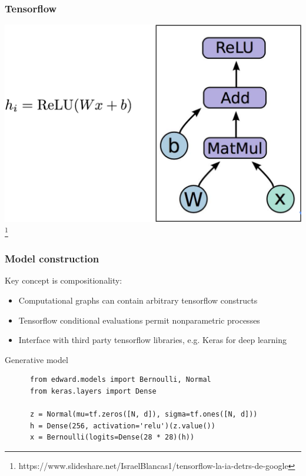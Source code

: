 \documentclass[10pt]{beamer}
\begin{document}
\begin{frame}[fragile]
  \frametitle{Tensorflow}
  \includegraphics[width=\textwidth]{img/tensorflow}
  \footnote{https://www.slideshare.net/IsraelBlancas1/tensorflow-la-ia-detrs-de-google}
\end{frame}


\begin{frame}[fragile]
  \frametitle{Model construction}
  Key concept is compositionality:
  \begin{itemize}
    \item Computational graphs can contain arbitrary tensorflow constructs
    \item Tensorflow conditional evaluations permit nonparametric processes
    \item Interface with third party tensorflow libraries, e.g. Keras for deep learning
  \end{itemize}
  \begin{block}{Generative model}
    \begin{verbatim}
      from edward.models import Bernoulli, Normal
      from keras.layers import Dense

      z = Normal(mu=tf.zeros([N, d]), sigma=tf.ones([N, d]))
      h = Dense(256, activation='relu')(z.value())
      x = Bernoulli(logits=Dense(28 * 28)(h))
    \end{verbatim}
  \end{block}
\end{frame}
\end{document}
